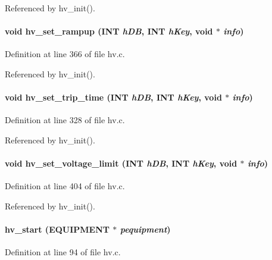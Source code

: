 Referenced by hv\_\-init().
\paragraph[{hv\_\-set\_\-rampup}]{\setlength{\rightskip}{0pt plus 5cm}void hv\_\-set\_\-rampup ({\bf INT} {\em hDB}, \/  {\bf INT} {\em hKey}, \/  void $\ast$ {\em info})}\hfill\label{hv_8c_a6c2c1ccdfbcf710a0a81249710b72cc4}


Definition at line 366 of file hv.c.

Referenced by hv\_\-init().
\paragraph[{hv\_\-set\_\-trip\_\-time}]{\setlength{\rightskip}{0pt plus 5cm}void hv\_\-set\_\-trip\_\-time ({\bf INT} {\em hDB}, \/  {\bf INT} {\em hKey}, \/  void $\ast$ {\em info})}\hfill\label{hv_8c_a3191cdab3dab02398919e46fbc289b82}


Definition at line 328 of file hv.c.

Referenced by hv\_\-init().
\paragraph[{hv\_\-set\_\-voltage\_\-limit}]{\setlength{\rightskip}{0pt plus 5cm}void hv\_\-set\_\-voltage\_\-limit ({\bf INT} {\em hDB}, \/  {\bf INT} {\em hKey}, \/  void $\ast$ {\em info})}\hfill\label{hv_8c_ae3c91ed41bc6b7f2182adfcd5549f710}


Definition at line 404 of file hv.c.

Referenced by hv\_\-init().
\paragraph[{hv\_\-start}]{ hv\_\-start ({\bf EQUIPMENT} $\ast$ {\em pequipment})}\hfill\label{hv_8c_aa65c35bd0a67b97f157e6cf96f8da0c2}


Definition at line 94 of file hv.c.

